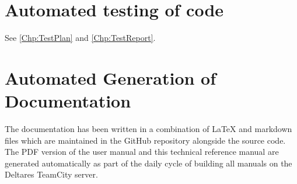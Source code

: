\section{Automated testing of code}

See \autoref{Chp:TestPlan} and \autoref{Chp:TestReport}.

\section{Automated Generation of Documentation}

The documentation has been written in a combination of LaTeX and markdown files which are maintained in the GitHub repository alongside the source code.
The PDF version of the user manual and this technical reference manual are generated automatically as part of the daily cycle of building all manuals on the Deltares TeamCity server.